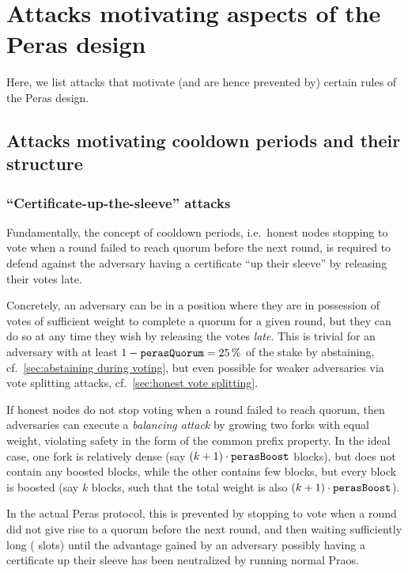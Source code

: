\section{Attacks motivating aspects of the Peras design}

Here, we list attacks that motivate (and are hence prevented by) certain rules of the Peras design.

\subsection{Attacks motivating cooldown periods and their structure}\label{sec:attack cooldowns}

\subsubsection{\enquote{Certificate-up-the-sleeve} attacks}

Fundamentally, the concept of cooldown periods, i.e.\ honest nodes stopping to vote when a round failed to reach quorum before the next round, is required to defend against the adversary having a certificate \enquote{up their sleeve} by releasing their votes late.

Concretely, an adversary can be in a position where they are in possession of votes of sufficient weight to complete a quorum for a given round, but they can do so at any time they wish by releasing the votes \emph{late}.
This is trivial for an adversary with at least $1-\mathtt{perasQuorum} = \qty{25}{\percent}$ of the stake by abstaining, cf.~\cref{sec:abstaining during voting}, but even possible for weaker adversaries via vote splitting attacks, cf.~\cref{sec:honest vote splitting}.

If honest nodes do not stop voting when a round failed to reach quorum, then adversaries can execute a \emph{balancing attack} by growing two forks with equal weight, violating safety in the form of the common prefix property.
In the ideal case, one fork is relatively dense (say $(k+1) \cdot \mathtt{perasBoost}$ blocks), but does not contain any boosted blocks, while the other contains few blocks, but every block is boosted (say $k$ blocks, such that the total weight is also $(k+1)\cdot\mathtt{perasBoost}$).

\medskip
In the actual Peras protocol, this is prevented by stopping to vote when a round did not give rise to a quorum before the next round, and then waiting sufficiently long (\Theal{} slots) until the advantage gained by an adversary possibly having a certificate up their sleeve has been neutralized by running normal Praos.


